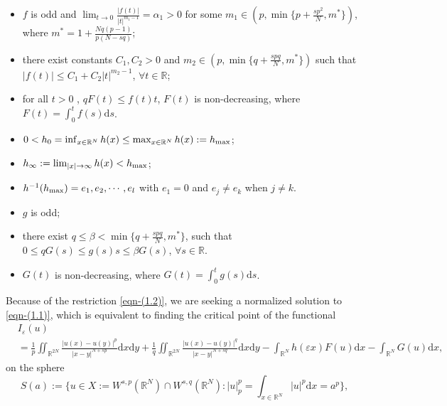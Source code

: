 \documentclass[reqno]{amsart}
\begin{document}
\begin{itemize}
\item[(A1)]  $f$ is odd and $\lim_{t\to 0}\frac{|f(t)|}{|t|^{m_1-1}}=\alpha_1 >0$ for some
$m_1\in(p,\min\{p+\frac{sp^2}{N},m^{*}\})$, where $m^{*}= 1+\frac{Nq(p-1)}{p(N-sq)}$;

\item[(A2)] there exist constants $C_1, C_2>0$ and $m_2\in(p,\min\{q+\frac{spq}{N},m^{*}\})$
such that $|f(t)|\le C_1+C_2|t|^{m_2-1}$, $\forall t\in \mathbb{R}$;

\item[(A3)] for all $t>0$ , $qF(t)\le f(t)t$, $F(t)$ is non-decreasing, where
$F(t)=\int_0^{t}f(s)\mathrm{d}s$.

\item[(A4)] $0<h_0=\inf_{x\in \mathbb{R}^{N}}h(x)\le \max_{x\in \mathbb{R}^{N}} h(x):=h_{\rm max}$;

\item[(A5)] $h_{\infty}:=\lim_{|x|\to \infty}h(x)<h_{\rm max}$;

\item[(A6)] $h^{-1}(h_{\rm max})={e_1,e_2,\cdots,e_l}$ with $e_1=0$ and $e_j\neq e_k$ when $j\neq k$.

\item[(A7)] $g$ is odd;

\item[(A8)] there exist $q\le\beta<\min\{q+\frac{spq}{N},m^{*}\}$, such that $0\le q G(s)\le g(s)s\le\beta G(s)$, $\forall s\in\mathbb{R}$.

\item[(A9)]  $G(t)$ is non-decreasing, where $G(t)=\int_0^{t}g(s)\mathrm{d}s$.
\end{itemize}
Because of  the restriction  \eqref{eqn-(1.2)}, we are seeking a normalized solution to
\eqref{eqn-(1.1)}, which is equivalent to finding the critical point of the  functional
\begin{align*}
&I_{\varepsilon}(u) \\
&=\frac{1}{p}\iint_{\mathbb{R}^{2N}}\frac{|u(x)-u(y)|^p}{|x-y|^{N+sp}}
\mathrm{d}x\mathrm{d}y
 +\frac{1}{q}\iint_{\mathbb{R}^{2N}}\frac{|u(x)-u(y)|^q}{|x-y|^{N+sq}}
 \mathrm{d}x\mathrm{d}y
 -\int_{\mathbb{R}^N}h(\varepsilon x)F(u)\mathrm{d}x-\int_{\mathbb{R}^{N}}G(u)
 \mathrm{d}x,
\end{align*}
on the sphere
\begin{equation}\label{eqn-(1.3)}
S(a):=\{u\in X:=W^{s,p}(\mathbb {R}^N)\cap W^{s,q}(\mathbb {R}^N):|u|_p^{p}=\int_{x\in \mathbb{R}^{N}}|u|^{p}\mathrm{d}x=a^{p}\},
\end{equation}
\end{document}
